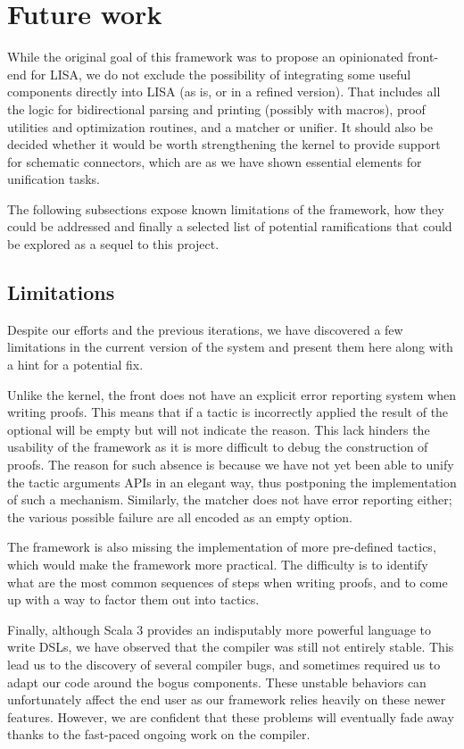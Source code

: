 \section{Future work}
\label{sec:future-work}

While the original goal of this framework was to propose an opinionated front-end for LISA, we do not exclude the possibility of integrating some useful components directly into LISA (as is, or in a refined version). That includes all the logic for bidirectional parsing and printing (possibly with macros), proof utilities and optimization routines, and a matcher or unifier. It should also be decided whether it would be worth strengthening the kernel to provide support for schematic connectors, which are as we have shown essential elements for unification tasks.

The following subsections expose known limitations of the framework, how they could be addressed and finally a selected list of potential ramifications that could be explored as a sequel to this project.

\subsection{Limitations}

Despite our efforts and the previous iterations, we have discovered a few limitations in the current version of the system and present them here along with a hint for a potential fix.

Unlike the kernel, the front does not have an explicit error reporting system when writing proofs. This means that if a tactic is incorrectly applied the result of the optional will be empty but will not indicate the reason. This lack hinders the usability of the framework as it is more difficult to debug the construction of proofs. The reason for such absence is because we have not yet been able to unify the tactic arguments APIs in an elegant way, thus postponing the implementation of such a mechanism. Similarly, the matcher does not have error reporting either; the various possible failure are all encoded as an empty option.

The framework is also missing the implementation of more pre-defined tactics, which would make the framework more practical. The difficulty is to identify what are the most common sequences of steps when writing proofs, and to come up with a way to factor them out into tactics.

Finally, although Scala 3 provides an indisputably more powerful language to write DSLs, we have observed that the compiler was still not entirely stable. This lead us to the discovery of several compiler bugs, and sometimes required us to adapt our code around the bogus components. These unstable behaviors can unfortunately affect the end user as our framework relies heavily on these newer features. However, we are confident that these problems will eventually fade away thanks to the fast-paced ongoing work on the compiler.

